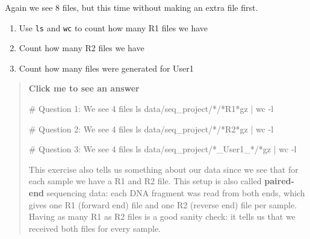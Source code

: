 \documentclass[
  letterpaper,
  DIV=11,
  numbers=noendperiod]{scrreprt}
\newenvironment{Shaded}{}{}
\newcommand{\AttributeTok}[1]{\textcolor[rgb]{0.84,0.23,0.29}{#1}}
\newcommand{\CommentTok}[1]{\textcolor[rgb]{0.42,0.45,0.49}{#1}}
\newcommand{\FunctionTok}[1]{\textcolor[rgb]{0.44,0.26,0.76}{#1}}
\newcommand{\KeywordTok}[1]{\textcolor[rgb]{0.84,0.23,0.29}{#1}}
\newcommand{\NormalTok}[1]{\textcolor[rgb]{0.14,0.16,0.18}{#1}}
\newcommand{\PreprocessorTok}[1]{\textcolor[rgb]{0.84,0.23,0.29}{#1}}
\providecommand{\tightlist}{%
  \setlength{\itemsep}{0pt}\setlength{\parskip}{0pt}}
\begin{document}
Again we see 8 files, but this time without making an extra file first.

\begin{tcolorbox}[enhanced jigsaw, coltitle=black, breakable, titlerule=0mm, colback=white, rightrule=.15mm, bottomrule=.15mm, toprule=.15mm, colframe=quarto-callout-color-frame, colbacktitle=quarto-callout-color!10!white, bottomtitle=1mm, opacitybacktitle=0.6, toptitle=1mm, leftrule=.75mm, arc=.35mm, title=\textcolor{quarto-callout-color}{\faInfo}\hspace{0.5em}{Exercise}, left=2mm, opacityback=0]

\begin{enumerate}
\def\labelenumi{\arabic{enumi}.}
\tightlist
\item
  Use \texttt{ls} and \texttt{wc} to count how many R1 files we have
\item
  Count how many R2 files we have
\item
  Count how many files were generated for User1
\end{enumerate}

\begin{quote}
\textbf{Click me to see an answer}

\begin{Shaded}
\begin{Highlighting}[]
\CommentTok{\# Question 1: We see 4 files}
\FunctionTok{ls}\NormalTok{ data/seq\_project/}\PreprocessorTok{*}\NormalTok{/}\PreprocessorTok{*}\NormalTok{R1}\PreprocessorTok{*}\NormalTok{gz }\KeywordTok{|} \FunctionTok{wc} \AttributeTok{{-}l} 

\CommentTok{\# Question 2: We see 4 files}
\FunctionTok{ls}\NormalTok{ data/seq\_project/}\PreprocessorTok{*}\NormalTok{/}\PreprocessorTok{*}\NormalTok{R2}\PreprocessorTok{*}\NormalTok{gz }\KeywordTok{|} \FunctionTok{wc} \AttributeTok{{-}l} 

\CommentTok{\# Question 3: We see 4 files}
\FunctionTok{ls}\NormalTok{ data/seq\_project/}\PreprocessorTok{*}\NormalTok{\_User1\_}\PreprocessorTok{*}\NormalTok{/}\PreprocessorTok{*}\NormalTok{gz }\KeywordTok{|} \FunctionTok{wc} \AttributeTok{{-}l} 
\end{Highlighting}
\end{Shaded}

This exercise also tells us something about our data since we see that
for each sample we have a R1 and R2 file. This setup is also called
\textbf{paired-end} sequencing data: each DNA fragment was read from
both ends, which gives one R1 (forward end) file and one R2 (reverse
end) file per sample. Having as many R1 as R2 files is a good sanity
check: it tells us that we received both files for every sample.
\end{quote}

\end{tcolorbox}
\end{document}
